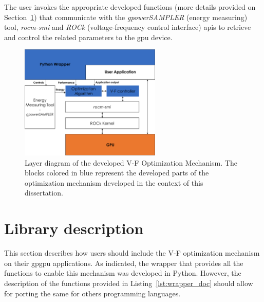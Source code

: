 The user invokes the appropriate developed functions (more details provided on Section~\ref{sec:usage}) that communicate with the \textit{gpowerSAMPLER} (energy measuring) tool, \textit{rocm-smi} and \textit{ROCk} (voltage-frequency control interface) \acrshort{api}s to retrieve and control the related parameters to the \acrshort{gpu} device. 

\begin{figure}[htb]
  \centering
  \includegraphics[width=0.6\textwidth]{Figures/Optimization/layerDiagram.pdf}
  \caption{Layer diagram of the developed V-F Optimization Mechanism. The blocks colored in blue represent the developed parts of the optimization mechanism developed in the context of this dissertation.}
  \label{fig:layer}
\end{figure}


\section{Library description}
\label{sec:usage}

This section describes how users should include the V-F optimization mechanism on their \acrshort{gpgpu} applications. As indicated, the wrapper that provides all the functions to enable this mechanism was developed in Python. However, the description of the functions provided in Listing~\ref{lst:wrapper_doc} should allow for porting the same for others programming languages. 

